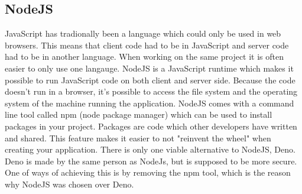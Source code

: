 \subsection{NodeJS}
JavaScript has tradionally been a language which could only be used in web browsers. This means that client code had to be in JavaScript and server code had to be in another language. When working on the same project it is often easier to only use one langauge. NodeJS is a JavaScript runtime which makes it possible to run JavaScript code on both client and server side. Because the code doesn't run in a browser, it's possible to access the file system and the operating system of the machine running the application. NodeJS comes with a command line tool called npm (node package manager) which can be used to install packages in your project. Packages are code which other developers have written and shared. This feature makes it easier to not "reinvent the wheel" when creating your application. There is only one viable alternative to NodeJS, Deno. Deno is made by the same person as NodeJs, but is supposed to be more secure. One of ways of achieving this is by removing the npm tool, which is the reason why NodeJS was chosen over Deno. 